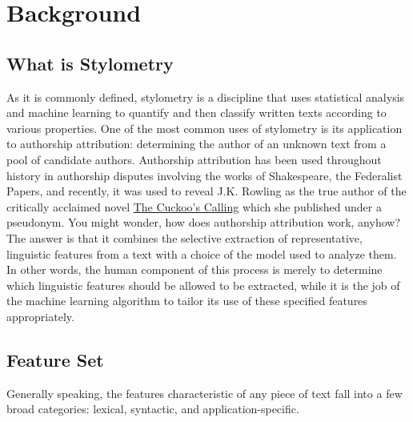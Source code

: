 \documentclass[pageno]{jpaper}
\begin{document}
\section{Background}
\label{sec:background}

\subsection{What is Stylometry}
\label{sec:whatIsStylometry}
As it is commonly defined, stylometry is a discipline that uses statistical analysis and machine learning to quantify and then classify written texts according to various properties.  One of the most common uses of stylometry is its application to authorship attribution: determining the author of an unknown text from a pool of candidate authors.  Authorship attribution has been used throughout history in authorship disputes involving  the works of Shakespeare, the Federalist Papers, and recently, it was used to reveal J.K. Rowling as the true author of the critically acclaimed novel \underline{The Cuckoo's Calling} which she published under a pseudonym.  You might wonder, how does authorship attribution work, anyhow?  The answer is that it combines the selective extraction of representative, linguistic features from a text with a choice of the model used to analyze them.  In other words, the human component of this process is merely to determine which linguistic features should be allowed to be extracted, while it is the job of the machine learning algorithm to tailor its use of these specified features appropriately.
\label{sec:authorship-attribution}

\subsection{Feature Set}
\label{sec:featureSet}
Generally speaking, the features characteristic of any piece of text fall into a few broad categories: lexical, syntactic, and application-specific.
\end{document}
